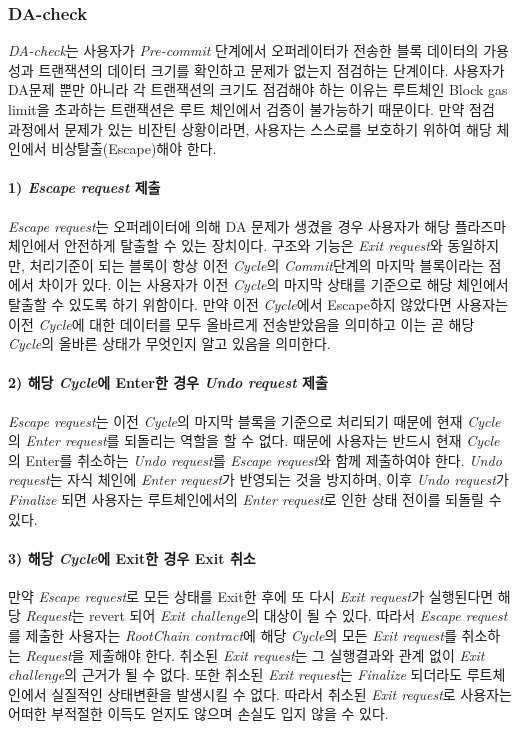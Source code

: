 \documentclass[letterpaper, 11pt]{article}
\begin{document}
\subsubsection{DA-check}
\begin{CJK}{UTF8}{mj}
\emph{DA-check}는 사용자가 \emph{Pre-commit} 단계에서 오퍼레이터가 전송한 블록 데이터의 가용성과 트랜잭션의 데이터 크기를 확인하고 문제가 없는지 점검하는 단계이다. 사용자가 DA문제 뿐만 아니라 각 트랜잭션의 크기도 점검해야 하는 이유는 루트체인 Block gas limit을 초과하는 트랜잭션은 루트 체인에서 검증이 불가능하기 때문이다. 만약 점검 과정에서 문제가 있는 비잔틴 상황이라면, 사용자는 스스로를 보호하기 위하여 해당 체인에서 비상탈출(Escape)해야 한다.

\paragraph{1) \emph{Escape request} 제출}
\emph{Escape request}는 오퍼레이터에 의해 DA 문제가 생겼을 경우 사용자가 해당 플라즈마 체인에서 안전하게 탈출할 수 있는 장치이다. 구조와 기능은 \emph{Exit request}와 동일하지만, 처리기준이 되는 블록이 항상 이전 \emph{Cycle}의 \emph{Commit}단계의 마지막 블록이라는 점에서 차이가 있다. 이는 사용자가 이전 \emph{Cycle}의 마지막 상태를 기준으로 해당 체인에서 탈출할 수 있도록 하기 위함이다. 만약 이전 \emph{Cycle}에서 Escape하지 않았다면 사용자는 이전 \emph{Cycle}에 대한 데이터를 모두 올바르게 전송받았음을 의미하고 이는 곧 해당 \emph{Cycle}의 올바른 상태가 무엇인지 알고 있음을 의미한다.

\paragraph{2) 해당 \emph{Cycle}에 Enter한 경우 \emph{Undo request} 제출}
\emph{Escape request}는 이전 \emph{Cycle}의 마지막 블록을 기준으로 처리되기 때문에 현재 \emph{Cycle}의 \emph{Enter request}를 되돌리는 역할을 할 수 없다. 때문에 사용자는 반드시 현재 \emph{Cycle}의 Enter를 취소하는 \emph{Undo request}를 \emph{Escape request}와 함께 제출하여야 한다. \emph{Undo request}는 자식 체인에 \emph{Enter request}가 반영되는 것을 방지하며, 이후 \emph{Undo request}가 \emph{Finalize} 되면 사용자는 루트체인에서의 \emph{Enter request}로 인한 상태 전이를 되돌릴 수 있다.

\paragraph{3) 해당 \emph{Cycle}에 Exit한 경우 Exit 취소}
만약 \emph{Escape request}로 모든 상태를 Exit한 후에 또 다시 \emph{Exit request}가 실행된다면 해당 \emph{Request}는 revert 되어 \emph{Exit challenge}의 대상이 될 수 있다. 따라서 \emph{Escape request}를 제출한 사용자는 \emph{RootChain contract}에 해당 \emph{Cycle}의 모든 \emph{Exit request}를 취소하는 \emph{Request}을 제출해야 한다. 취소된 \emph{Exit request}는 그 실행결과와 관계 없이 \emph{Exit challenge}의 근거가 될 수 없다. 또한 취소된 \emph{Exit request}는 \emph{Finalize} 되더라도 루트체인에서 실질적인 상태변환을 발생시킬 수 없다. 따라서 취소된 \emph{Exit request}로 사용자는 어떠한 부적절한 이득도 얻지도 않으며 손실도 입지 않을 수 있다.


\end{CJK}
\end{document}
